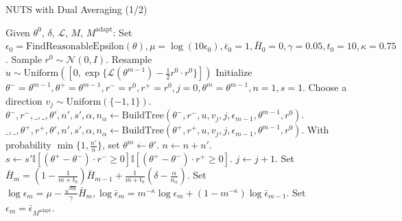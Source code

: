 \documentclass{beamer}
\begin{document}
\begin{frame}{NUTS with Dual Averaging (1/2)}
    \setcounter{algorithm}{5} %
    
    \begin{algorithm}[H]
    \tiny %
    \caption{No-U-Turn Sampler with Dual Averaging (Main Loop)}
    \begin{algorithmic}
    \STATE Given $\theta^0$, $\delta$, $\mathcal{L}$, $M$, $M^{\text{adapt}}$:
    \STATE Set $\epsilon_0 = \text{FindReasonableEpsilon}(\theta), \mu = \log(10\epsilon_0), \bar{\epsilon}_0 = 1, \bar{H}_0 = 0, \gamma = 0.05, t_0 = 10, \kappa = 0.75$.
        \STATE Sample $r^0 \sim \mathcal{N}(0, I)$.
        \STATE Resample $u \sim \text{Uniform}([0, \exp\{\mathcal{L}(\theta^{m-1}) - \frac{1}{2}r^0 \cdot r^0\}])$
        \STATE Initialize $\theta^- = \theta^{m-1}, \theta^+ = \theta^{m-1}, r^- = r^0, r^+ = r^0, j = 0, \theta^m = \theta^{m-1}, n = 1, s = 1$.
            \STATE Choose a direction $v_j \sim \text{Uniform}(\{-1, 1\})$.
                \STATE $\theta^-, r^-, \_ , \_ , \theta', n', s', \alpha, n_\alpha \gets \text{BuildTree}(\theta^-, r^-, u, v_j, j, \epsilon_{m-1}, \theta^{m-1}, r^0)$.
            \ELSE
                \STATE $\_ , \_ , \theta^+, r^+, \theta', n', s', \alpha, n_\alpha \gets \text{BuildTree}(\theta^+, r^+, u, v_j, j, \epsilon_{m-1}, \theta^{m-1}, r^0)$.
            \ENDIF
                \STATE With probability $\min\{1, \frac{n'}{n}\}$, set $\theta^m \gets \theta'$.
            \ENDIF
            \STATE $n \gets n + n'$.
            \STATE $s \gets s'\mathbb{I}[(\theta^+ - \theta^-) \cdot r^- \ge 0]\mathbb{I}[(\theta^+ - \theta^-) \cdot r^+ \ge 0]$.
            \STATE $j \gets j + 1$.
        \ENDWHILE
            \STATE Set $\bar{H}_m = \left(1 - \frac{1}{m+t_0}\right) \bar{H}_{m-1} + \frac{1}{m+t_0}(\delta - \frac{\alpha}{n_\alpha})$.
            \STATE Set $\log \epsilon_m = \mu - \frac{\sqrt{m}}{\gamma}\bar{H}_m, \log \bar{\epsilon}_m = m^{-\kappa} \log \epsilon_m + (1 - m^{-\kappa}) \log \bar{\epsilon}_{m-1}$.
        \ELSE
            \STATE Set $\epsilon_m = \bar{\epsilon}_{M^{\text{adapt}}}$.
        \ENDIF
    \ENDFOR
    \end{algorithmic}
    \end{algorithm}
\end{frame}
\end{document}
